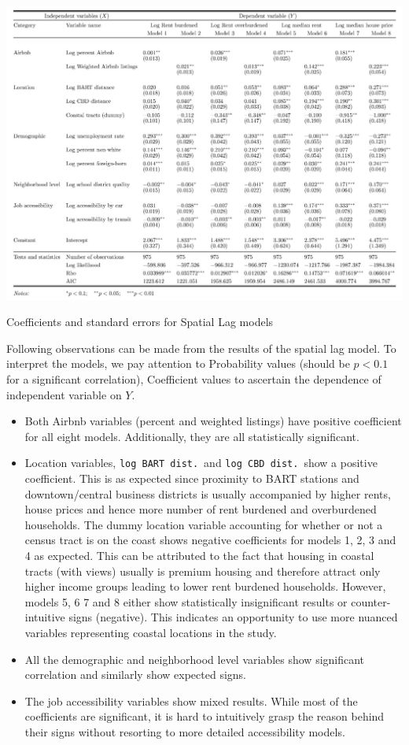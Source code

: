 \documentclass[10pt,letterpaper,onecolumn]{article}
\begin{document}
\begin{table}[h]
  \hspace*{-0.8cm}
  \includegraphics[width=1.1\textwidth]{table1}
  \caption{Coefficients and standard errors for Spatial Lag models}
\end{table}

Following observations can be made from the results of the spatial lag
model. To interpret the models, we pay attention to Probability values
(should be \(p<0.1\) for a significant correlation), Coefficient
values to ascertain the dependence of independent variable on \(Y\).

\begin{itemize}
\item
Both Airbnb variables (percent and weighted listings) have positive
coefficient for all eight models. Additionally, they are all
statistically significant.
\item
Location variables, \texttt{log BART dist.}\ and \texttt{log CBD dist.}\ show a positive
coefficient. This is as expected since proximity to BART stations and
downtown/central business districts is usually accompanied by higher
rents, house prices and hence more number of rent burdened and
overburdened households. The dummy location variable accounting for
whether or not a census tract is on the coast shows negative
coefficients for models 1, 2, 3 and 4 as expected. This can be
attributed to the fact that housing in coastal tracts (with views)
usually is premium housing and therefore attract only higher income
groups leading to lower rent burdened households. However, models 5, 6
7 and 8 either show statistically insignificant results or
counter-intuitive signs (negative). This indicates an opportunity to
use more nuanced variables representing coastal locations in the
study.
\item
All the demographic and neighborhood level variables show significant
correlation and similarly show expected signs.
\item
The job accessibility variables show mixed results. While most of the
coefficients are significant, it is hard to intuitively grasp the
reason behind their signs without resorting to more detailed
accessibility models.
\end{itemize}
\end{document}
